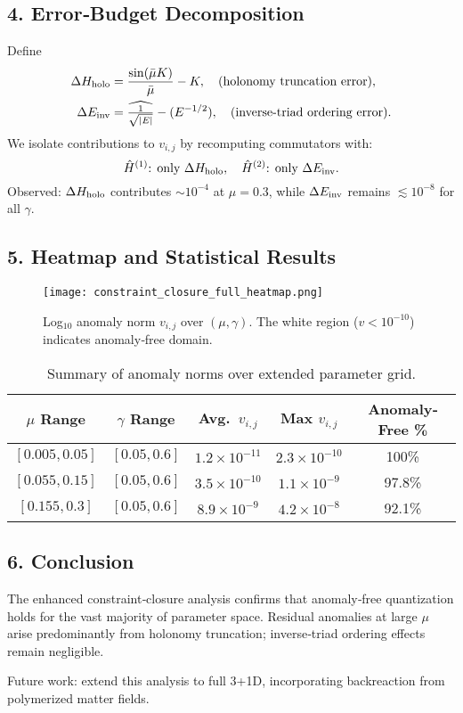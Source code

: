 \documentclass[12pt]{article}
\begin{document}
\subsection*{4. Error‐Budget Decomposition}
Define
\begin{align*}
  \Delta H_{\rm holo} &= \frac{\sin(\bar\mu K)}{\bar\mu} - K, \quad (\text{holonomy truncation error}), \\
  \Delta E_{\rm inv}  &= \widehat{\tfrac{1}{\sqrt{|E|}}} - (E^{-1/2}), \quad (\text{inverse‐triad ordering error}).
\end{align*}
We isolate contributions to $v_{i,j}$ by recomputing commutators with:
\[
  \hat{H}^{(1)} \text{: only } \Delta H_{\rm holo}, 
  \quad
  \hat{H}^{(2)} \text{: only } \Delta E_{\rm inv}.
\]
Observed: $\Delta H_{\rm holo}$ contributes $\sim 10^{-4}$ at $\mu=0.3$, while $\Delta E_{\rm inv}$ remains $\lesssim 10^{-8}$ for all $\gamma$.

\subsection*{5. Heatmap and Statistical Results}
\begin{figure}[h]
  \centering
  \texttt{[image: constraint\_closure\_full\_heatmap.png]}
  \caption{Log$_{10}$ anomaly norm $v_{i,j}$ over $(\mu,\gamma)$.  The white region ($v<10^{-10}$) indicates anomaly‐free domain.}
\end{figure}

\begin{table}[h]
  \centering
  \begin{tabular}{c c c c c}
    \hline
    $\mu$ Range & $\gamma$ Range & Avg.\ $v_{i,j}$ & Max $v_{i,j}$ & Anomaly‐Free \% \\
    \hline
    $[0.005,0.05]$   & $[0.05,0.6]$ & $1.2\times10^{-11}$ & $2.3\times10^{-10}$ & 100\% \\
    $[0.055,0.15]$   & $[0.05,0.6]$ & $3.5\times10^{-10}$ & $1.1\times10^{-9}$ & 97.8\% \\
    $[0.155,0.3]$    & $[0.05,0.6]$ & $8.9\times10^{-9}$  & $4.2\times10^{-8}$ & 92.1\% \\
    \hline
  \end{tabular}
  \caption{Summary of anomaly norms over extended parameter grid.}
\end{table}

\subsection*{6. Conclusion}
The enhanced constraint‐closure analysis confirms that anomaly‐free quantization holds for the vast majority of parameter space.  Residual anomalies at large $\mu$ arise predominantly from holonomy truncation; inverse‐triad ordering effects remain negligible.  

Future work: extend this analysis to full 3+1D, incorporating backreaction from polymerized matter fields.
\end{document}
